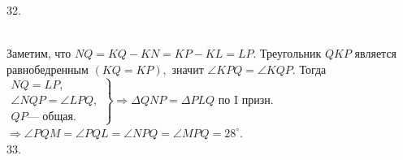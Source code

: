 \documentclass[12pt]{article}
\begin{document}
32. \begin{figure}[ht!]
\end{figure}\\
Заметим, что $NQ=KQ-KN=KP-KL=LP.$ Треугольник $QKP$ является равнобедренным $(KQ=KP),$ значит $\angle KPQ=\angle KQP.$ Тогда
$\left.\begin{array}{l}NQ=LP,\\
\angle NQP=\angle LPQ,\\
QP\text{--- общая.}  \end{array}\right\}\Rightarrow \Delta QNP=\Delta PLQ\text{ по I призн.}$\\$\Rightarrow \angle PQM=\angle PQL=\angle NPQ=\angle MPQ=28^\circ.$\\
33. \begin{figure}[ht!]
\end{figure}\\
\end{document}
